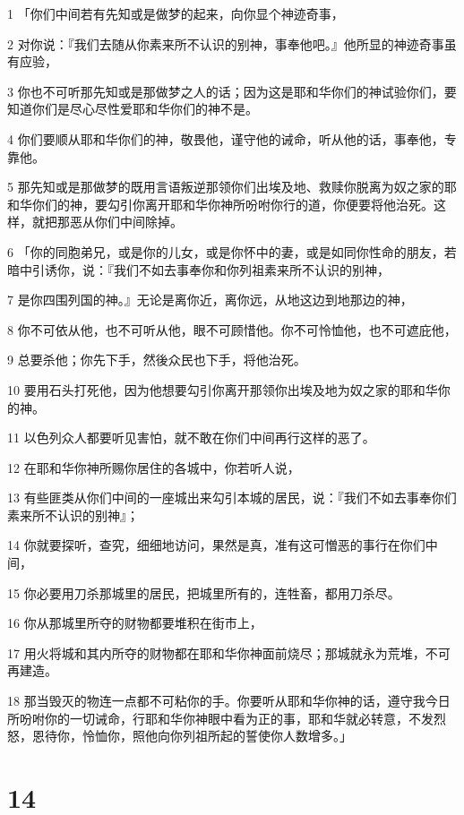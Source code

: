 \par 1 「你们中间若有先知或是做梦的起来，向你显个神迹奇事，
\par 2 对你说：『我们去随从你素来所不认识的别神，事奉他吧。』他所显的神迹奇事虽有应验，
\par 3 你也不可听那先知或是那做梦之人的话；因为这是耶和华你们的神试验你们，要知道你们是尽心尽性爱耶和华你们的神不是。
\par 4 你们要顺从耶和华你们的神，敬畏他，谨守他的诫命，听从他的话，事奉他，专靠他。
\par 5 那先知或是那做梦的既用言语叛逆那领你们出埃及地、救赎你脱离为奴之家的耶和华你们的神，要勾引你离开耶和华你神所吩咐你行的道，你便要将他治死。这样，就把那恶从你们中间除掉。
\par 6 「你的同胞弟兄，或是你的儿女，或是你怀中的妻，或是如同你性命的朋友，若暗中引诱你，说：『我们不如去事奉你和你列祖素来所不认识的别神，
\par 7 是你四围列国的神。』无论是离你近，离你远，从地这边到地那边的神，
\par 8 你不可依从他，也不可听从他，眼不可顾惜他。你不可怜恤他，也不可遮庇他，
\par 9 总要杀他；你先下手，然後众民也下手，将他治死。
\par 10 要用石头打死他，因为他想要勾引你离开那领你出埃及地为奴之家的耶和华你的神。
\par 11 以色列众人都要听见害怕，就不敢在你们中间再行这样的恶了。
\par 12 在耶和华你神所赐你居住的各城中，你若听人说，
\par 13 有些匪类从你们中间的一座城出来勾引本城的居民，说：『我们不如去事奉你们素来所不认识的别神』；
\par 14 你就要探听，查究，细细地访问，果然是真，准有这可憎恶的事行在你们中间，
\par 15 你必要用刀杀那城里的居民，把城里所有的，连牲畜，都用刀杀尽。
\par 16 你从那城里所夺的财物都要堆积在街市上，
\par 17 用火将城和其内所夺的财物都在耶和华你神面前烧尽；那城就永为荒堆，不可再建造。
\par 18 那当毁灭的物连一点都不可粘你的手。你要听从耶和华你神的话，遵守我今日所吩咐你的一切诫命，行耶和华你神眼中看为正的事，耶和华就必转意，不发烈怒，恩待你，怜恤你，照他向你列祖所起的誓使你人数增多。」

\chapter{14}

